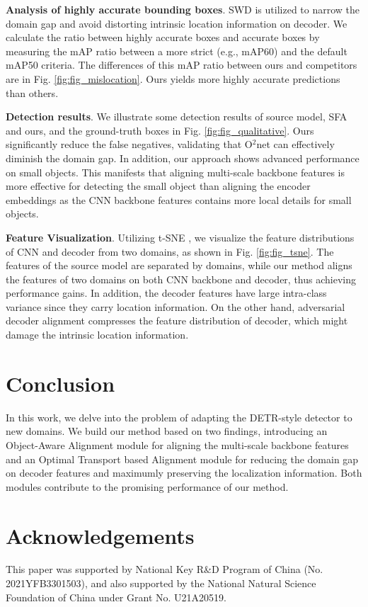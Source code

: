 \documentclass[sigconf]{acmart}
\begin{document}
\textbf{Analysis of highly accurate bounding boxes}.
\label{mislocation}
SWD is utilized to narrow the domain gap and avoid distorting intrinsic location information on decoder. We calculate the ratio between highly accurate boxes and accurate boxes by measuring the mAP ratio between a more strict (e.g., mAP60) and the default mAP50 criteria. The differences of this mAP ratio between ours and competitors are in Fig. \ref{fig:fig_mislocation}. Ours yields more highly accurate predictions than others.

\textbf{Detection results}. We illustrate some detection results of source model, SFA \cite{wang2021exploring} and ours, and the ground-truth boxes in Fig. \ref{fig:fig_qualitative}. Ours significantly reduce the false negatives, validating that O$^2$net can effectively diminish the domain gap. In addition, our approach shows advanced performance on small objects. This manifests that aligning multi-scale backbone features is more effective for detecting the small object than aligning the encoder embeddings as the CNN backbone features contains more local details for small objects.



\textbf{Feature Visualization}. Utilizing t-SNE \cite{tsne}, we visualize the feature distributions of CNN and decoder from two domains, as shown in Fig. \ref{fig:fig_tsne}. The features of the source model are separated by domains, while our method aligns the features of two domains on both CNN backbone and decoder, thus achieving performance gains. In addition, the decoder features have large intra-class variance since they carry location information. On the other hand, adversarial decoder alignment compresses the feature distribution of decoder, which might damage the intrinsic location information. 


 \section{Conclusion}
In this work, we delve into the problem of adapting the DETR-style detector to new domains. We build our method based on two findings, introducing an Object-Aware Alignment module for aligning the multi-scale backbone features and an Optimal Transport based Alignment module for reducing the domain gap on decoder features and maximumly preserving the localization information. Both modules contribute to the promising performance of our method. \vspace{-4mm}


\section*{Acknowledgements}
This paper was supported by National Key R\&D Program of China (No. 2021YFB3301503), and also supported by the National Natural Science Foundation of China under Grant No. U21A20519.

%
 


\balance

\end{document}

